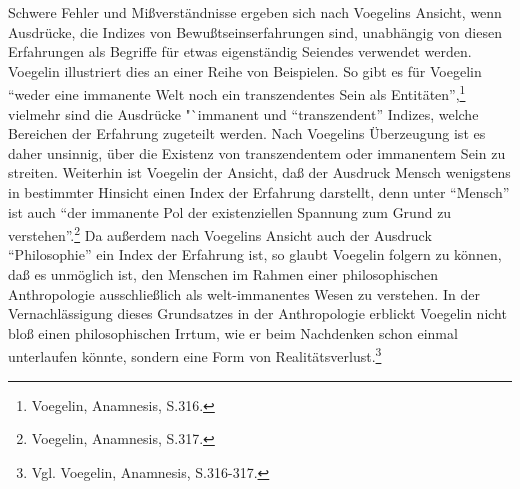 Schwere Fehler und Mißverständnisse ergeben sich nach Voegelins Ansicht, wenn
Ausdrücke, die Indizes von Bewußtseinserfahrungen sind, unabhängig von diesen
Erfahrungen als Begriffe für etwas eigenständig Seiendes verwendet werden.
Voegelin illustriert dies an einer Reihe von Beispielen. So gibt es für
Voegelin "`weder eine immanente Welt noch ein transzendentes Sein als
Entitäten"',\footnote{Voegelin, Anamnesis, S.316.} vielmehr sind die Ausdrücke
"`immanent und "`transzendent"' Indizes, welche Bereichen der Erfahrung
zugeteilt werden. Nach Voegelins Überzeugung ist es daher unsinnig, über die
Existenz von transzendentem oder immanentem Sein zu streiten. Weiterhin ist
Voegelin der Ansicht, daß der Ausdruck Mensch wenigstens in bestimmter
Hinsicht einen Index der Erfahrung darstellt, denn unter "`Mensch"' ist auch
"`der immanente Pol der existenziellen Spannung zum Grund zu
verstehen"'.\footnote{Voegelin, Anamnesis, S.317.} Da außerdem nach Voegelins
Ansicht auch der Ausdruck "`Philosophie"' ein Index der Erfahrung ist, so
glaubt Voegelin folgern zu können, daß es unmöglich ist, den Menschen im
Rahmen einer philosophischen Anthropologie ausschließlich als welt-immanentes
Wesen zu verstehen. In der Vernachlässigung dieses Grundsatzes in der
Anthropologie erblickt Voegelin nicht bloß einen philosophischen
Irrtum, wie er beim Nachdenken schon einmal unterlaufen könnte, sondern eine
Form von Realitätsverlust.\footnote{Vgl. Voegelin, Anamnesis, S.316-317.}

